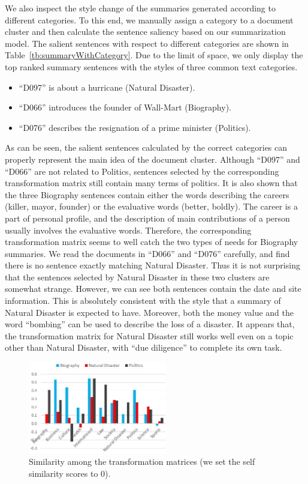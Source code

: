 \documentclass[letterpaper]{article}
\begin{document}
We also inspect the style change of the summaries generated according to different categories.
To this end, we manually assign a category to a document cluster and then calculate the sentence saliency based on our summarization model.
The salient sentences with respect to different categories are shown in Table~\ref{tb:summaryWithCategory}.
Due to the limit of space, we only display the top ranked summary sentences with the styles of three common text categories.
\begin{itemize}
\item ``D097'' is about a hurricane (Natural Disaster).
\item ``D066'' introduces the founder of Wall-Mart (Biography).
\item ``D076'' describes the resignation of a prime minister (Politics).
\end{itemize}
As can be seen, the salient sentences calculated by the correct categories can properly represent the main idea of the document cluster.
Although ``D097'' and ``D066'' are not related to Politics, sentences selected by the corresponding transformation matrix still contain many terms of politics.
It is also shown that the three Biography sentences contain either the words describing the careers (killer, mayor, founder) or the evaluative words (better, boldly).
The career is a part of personal profile, and the description of main contributions of a person usually involves the evaluative words.
Therefore, the corresponding transformation matrix seems to well catch the two types of needs for Biography summaries.
We read the documents in ``D066'' and ``D076'' carefully, and find there is no sentence exactly matching Natural Disaster.
Thus it is not surprising that the sentences selected by Natural Disaster in these two clusters are somewhat strange.
However, we can see both sentences contain the date and site information.
This is absolutely consistent with the style that a summary of Natural Disaster is expected to have.
Moreover, both the money value and the word ``bombing'' can be used to describe the loss of a disaster.
It appears that, the transformation matrix for Natural Disaster still works well even on a topic other than Natural Disaster, with ``due diligence'' to complete its own task.


\begin{figure}
\centering
\includegraphics[width=0.7200000000000001\linewidth,height=1.58in ]{CategoryMatrixSimilarity}
\caption{Similarity among the transformation matrices (we set the self similarity scores to 0).}
\label{fig:CategoryMatrixSimilarity}
\end{figure}
\end{document}
